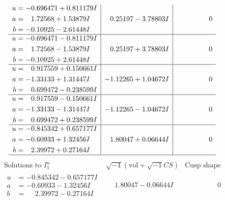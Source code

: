 \documentclass[1p]{elsarticle_modified}
\theoremstyle{definition}
\newcommand{\I}{\sqrt{-1}}
\begin{document}
$$\begin{array}{c|c|c}
\begin{aligned}
u &= -0.696471 + 0.811179 I \\
a &= \phantom{-}1.72568 + 1.53879 I \\
b &= -0.10925 - 2.61448 I\end{aligned}
 & \phantom{-}0.25197 - 3.78803 I & \phantom{-0.000000 } 0 \\ \hline\begin{aligned}
u &= -0.696471 - 0.811179 I \\
a &= \phantom{-}1.72568 - 1.53879 I \\
b &= -0.10925 + 2.61448 I\end{aligned}
 & \phantom{-}0.25197 + 3.78803 I & \phantom{-0.000000 } 0 \\ \hline\begin{aligned}
u &= \phantom{-}0.917559 + 0.150661 I \\
a &= -1.33133 + 1.31447 I \\
b &= \phantom{-}0.699472 - 0.238599 I\end{aligned}
 & -1.12265 + 1.04672 I & \phantom{-0.000000 } 0 \\ \hline\begin{aligned}
u &= \phantom{-}0.917559 - 0.150661 I \\
a &= -1.33133 - 1.31447 I \\
b &= \phantom{-}0.699472 + 0.238599 I\end{aligned}
 & -1.12265 - 1.04672 I & \phantom{-0.000000 } 0 \\ \hline\begin{aligned}
u &= -0.845342 + 0.657177 I \\
a &= -0.60933 + 1.32456 I \\
b &= \phantom{-}2.39972 + 0.27164 I\end{aligned}
 & \phantom{-}1.80047 + 0.06644 I & \phantom{-0.000000 } 0\\
 \hline 
 \end{array}$$\newpage$$\begin{array}{c|c|c}  
\text{Solutions to }I^u_{1}& \I (\text{vol} + \sqrt{-1}CS) & \text{Cusp shape}\\
 \hline 
\begin{aligned}
u &= -0.845342 - 0.657177 I \\
a &= -0.60933 - 1.32456 I \\
b &= \phantom{-}2.39972 - 0.27164 I\end{aligned}
 & \phantom{-}1.80047 - 0.06644 I & \phantom{-0.000000 } 0 \\ \hline\begin{aligned}

\end{aligned}
\end{array}$$
\end{document}
